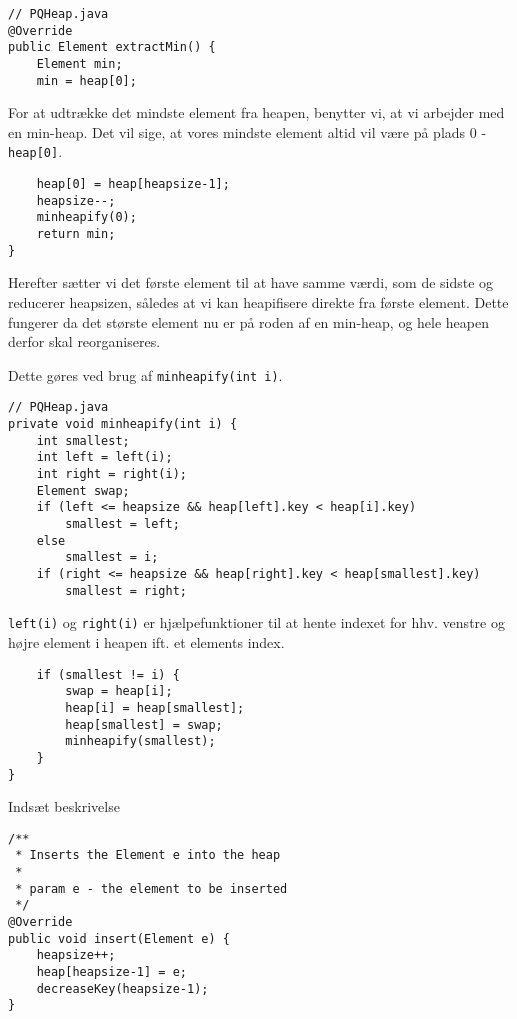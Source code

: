 \documentclass{article}
\begin{document}
\begin{lstlisting}
// PQHeap.java
@Override
public Element extractMin() {
    Element min;
    min = heap[0];    
\end{lstlisting}
For at udtrække det mindste element fra heapen, benytter vi, at vi arbejder med en min-heap. Det vil sige, at vores mindste element altid vil være på plads 0 - \texttt{heap[0]}.
\begin{lstlisting}    
    heap[0] = heap[heapsize-1];
    heapsize--;
    minheapify(0);
    return min;
}
\end{lstlisting}
Herefter sætter vi det første element til at have samme værdi, som de sidste og reducerer heapsizen, således at vi kan heapifisere direkte fra første element. Dette fungerer da det største element nu er på roden af en min-heap, og hele heapen derfor skal reorganiseres. \newline

\noindent Dette gøres ved brug af \texttt{minheapify(int i)}.
\begin{lstlisting}
// PQHeap.java
private void minheapify(int i) {
    int smallest;
    int left = left(i);
    int right = right(i);
    Element swap;
    if (left <= heapsize && heap[left].key < heap[i].key)
        smallest = left;
    else
        smallest = i;
    if (right <= heapsize && heap[right].key < heap[smallest].key)
        smallest = right;
\end{lstlisting}
\texttt{left(i)} og \texttt{right(i)} er hjælpefunktioner til at hente indexet for hhv. venstre og højre element i heapen ift. et elements index.
\begin{lstlisting}
    if (smallest != i) {
        swap = heap[i];
        heap[i] = heap[smallest];
        heap[smallest] = swap;
        minheapify(smallest);
    }
}
\end{lstlisting}


Indsæt beskrivelse
\begin{lstlisting}
/**
 * Inserts the Element e into the heap
 *
 * param e - the element to be inserted
 */
@Override
public void insert(Element e) {
    heapsize++;
    heap[heapsize-1] = e;
    decreaseKey(heapsize-1);
}
\end{lstlisting}


\newpage
\end{document}
